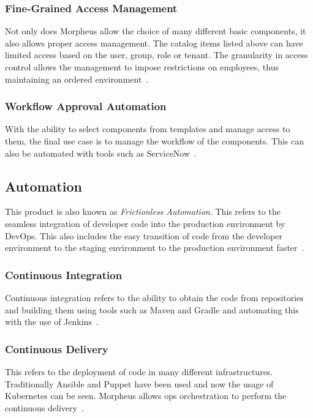 \subsubsection{Fine-Grained Access Management}

Not only does Morpheus allow the choice of many different basic components, it 
also allows proper access management. The catalog items listed above can have 
limited access based on the user, group, role or tenant. The granularity in 
access control allows the management to impose restrictions on employees, thus 
maintaining an ordered environment~\cite{hid-sp18-416-www-morpheus-control}.

\subsubsection{Workflow Approval Automation}

With the ability to select components from templates and manage access to them, 
the final use case is to manage the workflow of the components. This can also 
be automated with tools such as 
ServiceNow~\cite{hid-sp18-416-www-morpheus-control}. 

\subsection{Automation}

This product is also known as \textit{Frictionless Automation}. This refers to 
the seamless integration of developer code into the production environment by 
DevOps. This also includes the easy transition of code from the developer 
environment to the staging environment to the production 
environment faster~\cite{hid-sp18-416-www-morpheus-product-guide}. 

\subsubsection{Continuous Integration}

Continuous integration refers to the ability to obtain the code from 
repositories and building them using tools such as Maven and Gradle and 
automating this with the use of 
Jenkins~\cite{hid-sp18-416-www-morpheus-automation}.

\subsubsection{Continuous Delivery}

This refers to the deployment of code in many different infrastructures. 
Traditionally Ansible and Puppet have been used and now the usage of Kubernetes 
can be seen. Morpheus allows ops orchestration to perform the continuous 
delivery~\cite{hid-sp18-416-www-morpheus-automation}.

